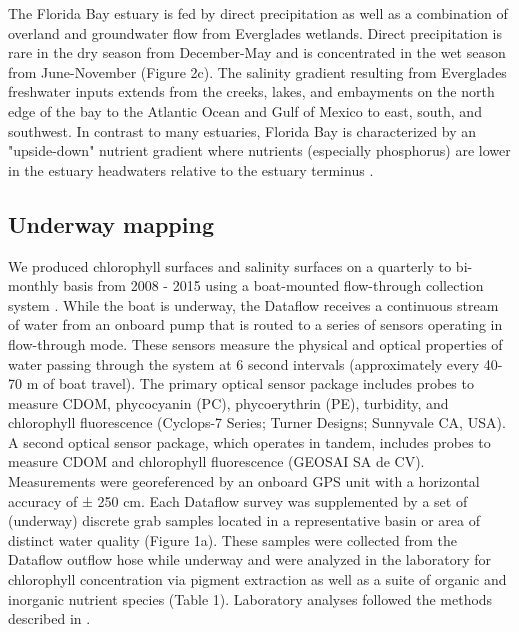 The Florida Bay estuary is fed by direct precipitation as well as  a combination of overland and groundwater flow from Everglades wetlands. Direct precipitation is rare in the dry season from December-May and is concentrated in the wet season from June-November (Figure 2c). The salinity gradient resulting from Everglades freshwater inputs extends from the creeks, lakes, and embayments on the north edge of the bay to the Atlantic Ocean and Gulf of Mexico to east, south, and southwest. In contrast to many estuaries, Florida Bay is characterized by an "upside-down" nutrient gradient where nutrients (especially phosphorus) are lower in the estuary headwaters relative to the estuary terminus \citep{childers_relating_2006}.

\subsection{Underway mapping}
\label{chlmapping}

We produced chlorophyll surfaces and salinity surfaces on a quarterly to bi-monthly basis from 2008 - 2015 using a boat-mounted flow-through collection system \citep["Dataflow", ][]{madden1992instrument}. While the boat is underway, the Dataflow receives a continuous stream of water from an onboard pump that is routed to a series of sensors operating in flow-through mode. These sensors measure the physical and optical properties of water passing through the system at 6 second intervals (approximately every 40-70 m of boat travel). The primary optical sensor package includes probes to measure CDOM, phycocyanin (PC), phycoerythrin (PE), turbidity, and chlorophyll fluorescence (Cyclops-7 Series; Turner Designs; Sunnyvale CA, USA). A second optical sensor package, which operates in tandem, includes probes to measure CDOM and chlorophyll fluorescence (GEOSAI SA de CV). Measurements were georeferenced by an onboard GPS unit with a horizontal accuracy of ± 250 cm. Each Dataflow survey was supplemented by a set of (underway) discrete grab samples located in a representative basin or area of distinct water quality (Figure 1a). These samples were collected from the Dataflow outflow hose while underway and were analyzed in the laboratory for chlorophyll concentration via pigment extraction as well as a suite of organic and inorganic nutrient species (Table 1). Laboratory analyses followed the methods described in \citet{childers_relating_2006}. 

